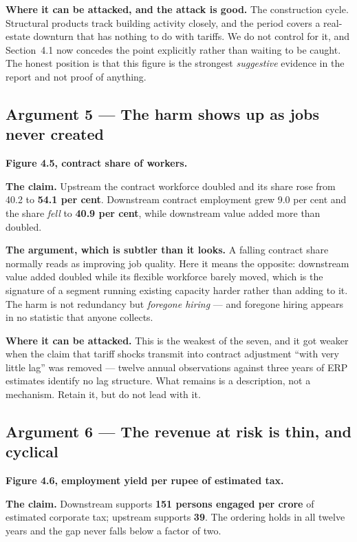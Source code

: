 \documentclass[11pt, a4paper]{article}
\begin{document}
\textbf{Where it can be attacked, and the attack is good.} The construction cycle. Structural
products track building activity closely, and the period covers a real-estate downturn
that has nothing to do with tariffs. We do not control for it, and Section~4.1 now
concedes the point explicitly rather than waiting to be caught. The honest position is
that this figure is the strongest \emph{suggestive} evidence in the report and not
proof of anything.

\subsection{Argument 5 --- The harm shows up as jobs never created}
\textbf{Figure 4.5, contract share of workers.}

\textbf{The claim.} Upstream the contract workforce doubled and its share rose from
40.2 to \textbf{54.1 per cent}. Downstream contract employment grew 9.0 per cent and
the share \emph{fell} to \textbf{40.9 per cent}, while downstream value added more
than doubled.

\textbf{The argument, which is subtler than it looks.} A falling contract share
normally reads as improving job quality. Here it means the opposite: downstream value
added doubled while its flexible workforce barely moved, which is the signature of a
segment running existing capacity harder rather than adding to it. The harm is not
redundancy but \emph{foregone hiring} --- and foregone hiring appears in no statistic
that anyone collects.

\textbf{Where it can be attacked.} This is the weakest of the seven, and it got weaker
when the claim that tariff shocks transmit into contract adjustment ``with very little
lag'' was removed --- twelve annual observations against three years of ERP estimates
identify no lag structure. What remains is a description, not a mechanism. Retain it,
but do not lead with it.

\subsection{Argument 6 --- The revenue at risk is thin, and cyclical}
\textbf{Figure 4.6, employment yield per rupee of estimated tax.}

\textbf{The claim.} Downstream supports \textbf{151 persons engaged per crore} of
estimated corporate tax; upstream supports \textbf{39}. The ordering holds in all
twelve years and the gap never falls below a factor of two.
\end{document}
